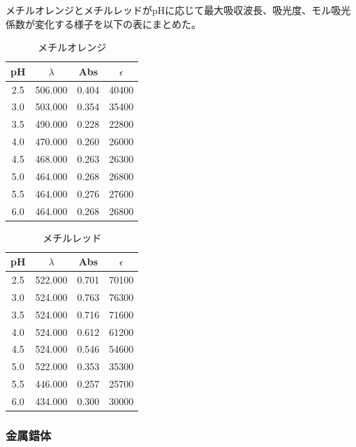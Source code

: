 \documentclass[a4paper,papersize,dvipdfmx]{jsarticle}
\begin{document}
メチルオレンジとメチルレッドがpHに応じて最大吸収波長、吸光度、モル吸光係数が変化する様子を以下の表にまとめた。

\begin{table}[H]
\begin{center}
\begin{tabular}{|c|c|c|c|}
\hline
pH & $\lambda$  & Abs   & $\epsilon$     \\ \hline
2.5 & 506.000 & 0.404 & 40400 \\ \hline
3.0 & 503.000 & 0.354 & 35400 \\ \hline
3.5 & 490.000 & 0.228 & 22800 \\ \hline
4.0 & 470.000 & 0.260 & 26000 \\ \hline
4.5 & 468.000 & 0.263 & 26300 \\ \hline
5.0 & 464.000 & 0.268 & 26800 \\ \hline
5.5 & 464.000 & 0.276 & 27600 \\ \hline
6.0 & 464.000 & 0.268 & 26800 \\ \hline
\end{tabular}
\caption{メチルオレンジ}
\end{center}
\end{table}


\begin{table}[H]
\begin{center}
\begin{tabular}{|c|c|c|c|}
\hline
pH & $\lambda$  & Abs   & $\epsilon$     \\ \hline
2.5 & 522.000 & 0.701 & 70100 \\ \hline
3.0 & 524.000 & 0.763 & 76300 \\ \hline
3.5 & 524.000 & 0.716 & 71600 \\ \hline
4.0 & 524.000 & 0.612 & 61200 \\ \hline
4.5 & 524.000 & 0.546 & 54600 \\ \hline
5.0 & 522.000 & 0.353 & 35300 \\ \hline
5.5 & 446.000 & 0.257 & 25700 \\ \hline
6.0 & 434.000 & 0.300 & 30000 \\ \hline
\end{tabular}
\caption{メチルレッド}
\end{center}
\end{table}

\subsubsection*{金属錯体}
\end{document}
